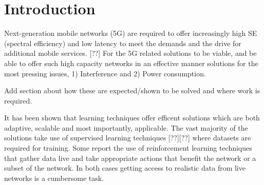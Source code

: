 \documentclass[conference]{IEEEtran}
\begin{document}




\maketitle

\begin{abstract}

\end{abstract}





%
\IEEEpeerreviewmaketitle



\section{Introduction}
Next-generation mobile networks (5G) are required to offer increasingly high SE (spectral efficiency) and low latency to meet the demands and the drive for additional mobile services. [??] For the 5G related solutions to be viable, and be able to offer such high capacity networks in an effective manner solutions for the most pressing issues, 1) Interference and 2) Power consumption.

Add section about how these are expected/shown to be solved and where work is required.

It has been shown that learning techniques offer efficent solutions which are both adaptive, scalable and most importantly, applicable. The vast majority of the solutions take use of supervised learning techniques [??][??] where datasets are required for training. Some report the use of reinforcement learning techniques that gather data live and take appropriate actions that benefit the network or a subset of the network. In both cases getting access to realistic data from live networks is a cumbersome task.
\end{document}
